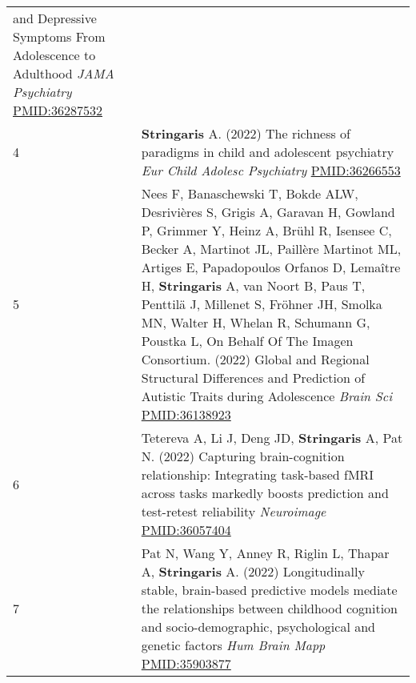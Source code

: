 \documentclass[
]{article}
\begin{document}
\begin{longtable}[]{@{}ll@{}}
\begin{minipage}[t]{0.94\columnwidth}
and Depressive Symptoms From Adolescence to Adulthood \emph{JAMA
Psychiatry} \url{PMID:36287532}\strut
\end{minipage}\tabularnewline
\begin{minipage}[t]{0.01\columnwidth}\raggedright
4\strut
\end{minipage} & \begin{minipage}[t]{0.94\columnwidth}\raggedright
\textbf{Stringaris} A. (2022) The richness of paradigms in child and
adolescent psychiatry \emph{Eur Child Adolesc Psychiatry}
\url{PMID:36266553}\strut
\end{minipage}\tabularnewline
\begin{minipage}[t]{0.01\columnwidth}\raggedright
5\strut
\end{minipage} & \begin{minipage}[t]{0.94\columnwidth}\raggedright
Nees F, Banaschewski T, Bokde ALW, Desrivières S, Grigis A, Garavan H,
Gowland P, Grimmer Y, Heinz A, Brühl R, Isensee C, Becker A, Martinot
JL, Paillère Martinot ML, Artiges E, Papadopoulos Orfanos D, Lemaître H,
\textbf{Stringaris} A, van Noort B, Paus T, Penttilä J, Millenet S,
Fröhner JH, Smolka MN, Walter H, Whelan R, Schumann G, Poustka L, On
Behalf Of The Imagen Consortium. (2022) Global and Regional Structural
Differences and Prediction of Autistic Traits during Adolescence
\emph{Brain Sci} \url{PMID:36138923}\strut
\end{minipage}\tabularnewline
\begin{minipage}[t]{0.01\columnwidth}\raggedright
6\strut
\end{minipage} & \begin{minipage}[t]{0.94\columnwidth}\raggedright
Tetereva A, Li J, Deng JD, \textbf{Stringaris} A, Pat N. (2022)
Capturing brain-cognition relationship: Integrating task-based fMRI
across tasks markedly boosts prediction and test-retest reliability
\emph{Neuroimage} \url{PMID:36057404}\strut
\end{minipage}\tabularnewline
\begin{minipage}[t]{0.01\columnwidth}\raggedright
7\strut
\end{minipage} & \begin{minipage}[t]{0.94\columnwidth}\raggedright
Pat N, Wang Y, Anney R, Riglin L, Thapar A, \textbf{Stringaris} A.
(2022) Longitudinally stable, brain-based predictive models mediate the
relationships between childhood cognition and socio-demographic,
psychological and genetic factors \emph{Hum Brain Mapp}
\url{PMID:35903877}\strut
\end{minipage}\tabularnewline

\end{longtable}
\end{document}
